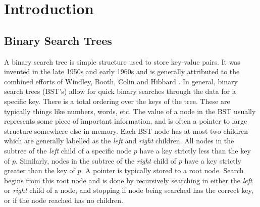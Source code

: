 \documentclass[letterpaper,12pt,titlepage,oneside,final]{book}
\theoremstyle{plain}
\begin{document}
 


\chapter{Introduction}


\section{Binary Search Trees}

A binary search tree is simple structure used to store key-value pairs. It was invented in the late 1950s and early 1960s and is generally attributed to the combined efforts of Windley, Booth, Colin and Hibbard \cite{windley1960trees} \cite{booth1960efficiency} \cite{hibbard1962some}. In general, binary search trees (BST's) allow for quick binary searches through the data for a specific key. There is a total ordering over the keys of the tree. These are typically things like numbers, words, etc. The value of a node in the BST usually represents some piece of important information, and is often a pointer to large structure somewhere else in memory. Each BST node has at most two children which are generally labelled as the \textit{left} and \textit{right} children. All nodes in the subtree of the \textit{left} child of a specific node $p$ have a key strictly less than the key of $p$. Similarly, nodes in the subtree of the \textit{right} child of $p$ have a key strictly greater than the key of $p$. A pointer is typically stored to a root node. Search begins from this root node and is done by recursively searching in either the \textit{left} or \textit{right} child of a node, and stopping if node being searched has the correct key, or if the node reached has no children.
\end{document}
